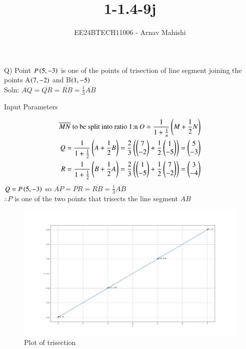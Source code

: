 \documentclass[journal]{IEEEtran}
\begin{document}

\vspace{3cm}

\title{1-1.4-9j}
\author{EE24BTECH11006 - Arnav Mahishi}
{\let\newpage\relax\maketitle}

\renewcommand{\thefigure}{\theenumi}
\renewcommand{\thetable}{\theenumi}
\setlength{\intextsep}{10pt} %


\renewcommand{\thetable}{\theenumi}

Q) Point $P\left(5,-3\right)$ is one of the points of trisection of line segment joining the points A$\left(7,-2\right)$ and B$\left(1,-5\right)$
\\Soln: $\overline{AQ}=\overline{QR}=\overline{RB}=\frac{1}{3}\overline{AB}$ 
\begin{table}[h!]    
  \centering
  
  \caption{Input Parameters}
\end{table}

\begin{align}
\text{$\overline{MN}$ to be split into ratio 1:n }
O=\frac{1}{1+\frac{1}{n}}\left(M+\frac{1}{2}N\right)\\
Q=\frac{1}{1+\frac{1}{2}}\left(A+\frac{1}{2}B\right)=
\frac{2}{3}\left(\begin{pmatrix}7\\-2\end{pmatrix}+\frac{1}{2}\begin{pmatrix}1\\-5\end{pmatrix}\right)=\begin{pmatrix}5\\-3\end{pmatrix}\\
R=\frac{1}{1+\frac{1}{2}}\left(B+\frac{1}{2}A\right)=
\frac{2}{3}\left(\begin{pmatrix}1\\-5\end{pmatrix}+\frac{1}{2}\begin{pmatrix}7\\-2\end{pmatrix}\right)=\begin{pmatrix}3\\-4\end{pmatrix}
\end{align}
$Q=P\left(5,-3\right)$ so $\overline{AP}=\overline{PR}=\overline{RB}=\frac{1}{3}\overline{AB}$  \\
$\therefore P$ is one of the two points that trisects the line segment $\overline{AB}$
\begin{figure}[h!]
   \centering
   \includegraphics[width=0.7\linewidth]{figs/Figure_1.png}
   \caption{Plot of trisection}
   \label{stemplot}
\end{figure}
\end{document}
